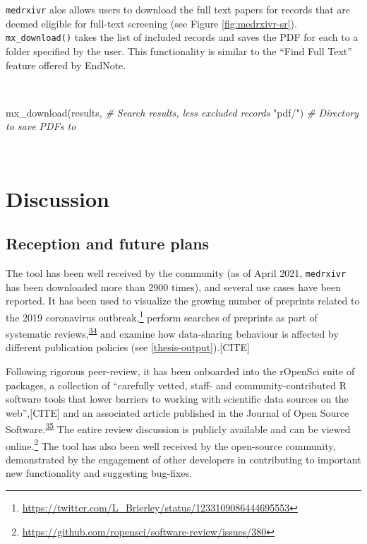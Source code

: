 \documentclass[a4paper, twoside]{templates/ociamthesis}
\newenvironment{Shaded}{\begin{snugshade}}{\end{snugshade}}
\newcommand{\CommentTok}[1]{\textcolor[rgb]{0.56,0.35,0.01}{\textit{#1}}}
\newcommand{\FunctionTok}[1]{\textcolor[rgb]{0.00,0.00,0.00}{#1}}
\newcommand{\NormalTok}[1]{#1}
\newcommand{\StringTok}[1]{\textcolor[rgb]{0.31,0.60,0.02}{#1}}
\renewenvironment{Shaded}
{
  \vspace{4pt}%
  \begin{snugshade}%
}{%
  \end{snugshade}%
  \vspace{4pt}%
}
\begin{document}
\texttt{medrxivr} alos allows users to download the full text papers for records that are deemed eligible for full-text screening (see Figure \ref{fig:medrxivr-sr}). \texttt{mx\_download()} takes the list of included records and saves the PDF for each to a folder specified by the user. This functionality is similar to the ``Find Full Text'' feature offered by EndNote.

~

\begin{Shaded}
\begin{Highlighting}[]
\FunctionTok{mx\_download}\NormalTok{(results,  }\CommentTok{\# Search results, less excluded records}
            \StringTok{"pdf/"}\NormalTok{)   }\CommentTok{\# Directory to save PDFs to }
\end{Highlighting}
\end{Shaded}

~

\hypertarget{discussion}{%
\section{Discussion}\label{discussion}}

\hypertarget{reception-and-future-plans}{%
\subsection{Reception and future plans}\label{reception-and-future-plans}}

The tool has been well received by the community (as of April 2021, \texttt{medrxivr} has been downloaded more than 2900 times), and several use cases have been reported. It has been used to visualize the growing number of preprints related to the 2019 coronavirus outbreak,\footnote{\url{https://twitter.com/L_Brierley/status/1233109086444695553}} perform searches of preprints as part of systematic reviews,\textsuperscript{\protect\hyperlink{ref-noone2020}{34}} and examine how data-sharing behaviour is affected by different publication policies (see \ref{thesis-output}).{[}CITE{]}

Following rigorous peer-review, it has been onboarded into the rOpenSci suite of packages, a collection of ``carefully vetted, staff- and community-contributed R software tools that lower barriers to working with scientific data sources on the web'',{[}CITE{]} and an associated article published in the Journal of Open Source Software.\textsuperscript{\protect\hyperlink{ref-mcguinness2020a}{35}} The entire review discussion is publicly available and can be viewed online.\footnote{\url{https://github.com/ropensci/software-review/issues/380}} The tool has also been well received by the open-source community, demonstrated by the engagement of other developers in contributing to important new functionality and suggesting bug-fixes.
\end{document}
